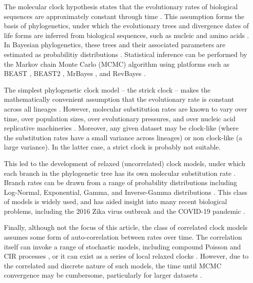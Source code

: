 \documentclass[10pt,letterpaper]{article}
\begin{document}
The molecular clock hypothesis states that the evolutionary rates of biological sequences are approximately constant through time \cite{zuckerkandl1962molecular}.
This assumption forms the basis of phylogenetics, under which the evolutionary trees and divergence dates of life forms are inferred from biological sequences, such as nucleic and amino acids \cite{douzery2003local, drummond2006relaxed}.
In Bayesian phylogenetics, these trees and their associated parameters are estimated as probabilitiy distributions \cite{kuhner1995estimating, larget1999markov, mau1999bayesian}. 
Statistical inference can be performed by the Markov chain Monte Carlo (MCMC) algorithm \cite{metropolis53, hastings70} using platforms such as BEAST \cite{drummond2012bayesian}, BEAST2 \cite{bouckaert2019beast}, MrBayes \cite{ronquist2012mrbayes}, and RevBayes \cite{hohna2016revbayes}.



The simplest phylogenetic clock model -- the strick clock -- makes the mathematically convenient assumption that the evolutionary rate is constant across all lineages \cite{zuckerkandl1965evolutionary, kuhner1995estimating, larget1999markov}.  %
However, molecular substitution rates are known to vary over time, over population sizes, over evolutionary pressures, and over nucleic acid replicative machineries \cite{gillespie1994causes, woolfit2009effective, loh2010optimization}.
Moreover, any given dataset may be clock-like (where the substitution rates have a small variance across lineages) or non clock-like (a large variance). 
In the latter case, a strict clock is probably not suitable. 



This led to the development of relaxed (uncorrelated) clock models, under which each branch in the phylogenetic tree has its own molecular substitution rate  \cite{drummond2006relaxed}.
Branch rates can be drawn from a range of probability distributions including Log-Normal, Exponential, Gamma, and Inverse-Gamma distributions \cite{drummond2006relaxed, lepage2007general, li2012model}.
This class of models is widely used, and has aided insight into many recent biological problems, including the 2016 Zika virus outbreak \cite{faria2017establishment} and the COVID-19 pandemic \cite{giovanetti2020first}.

Finally, although not the focus of this article, the class of correlated clock models assumes some form of auto-correlation between rates over time. 
The correlation itself can invoke a range of stochastic models, including compound Poisson \cite{huelsenbeck2000compound} and CIR processes \cite{lepage2007general}, or it can exist as a series of local relaxed clocks \cite{drummond2010bayesian}. 
However, due to the correlated and discrete nature of such models, the time until MCMC convergence may be cumbersome, particularly for larger datasets \cite{drummond2010bayesian}.  
\end{document}
